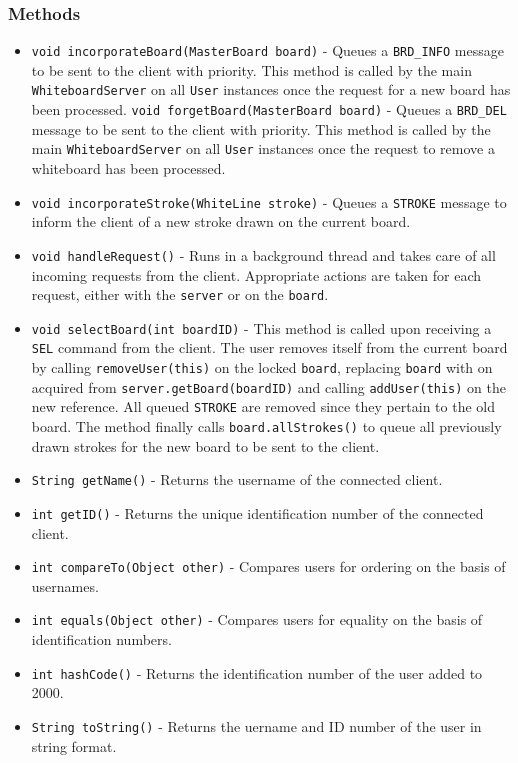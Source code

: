 \subsubsection{Methods}
\begin{itemize}
\item \texttt{void incorporateBoard(MasterBoard board)} - Queues a \texttt{BRD\_INFO} message to be sent to the client with priority. This method is called by the main \texttt{WhiteboardServer} on all \texttt{User} instances once the request for a new board has been processed.
\texttt{void forgetBoard(MasterBoard board)} - Queues a \texttt{BRD\_DEL} message to be sent to the client with priority. This method is called by the main \texttt{WhiteboardServer} on all \texttt{User} instances once the request to remove a whiteboard has been processed.
\item \texttt{void incorporateStroke(WhiteLine stroke)} - Queues a \texttt{STROKE} message to inform the client of a new stroke drawn on the current board.
\item \texttt{void handleRequest()} - Runs in a background thread and takes care of all incoming requests from the client. Appropriate actions are taken for each request, either with the \texttt{server} or on the \texttt{board}.
\item \texttt{void selectBoard(int boardID)} - This method is called upon receiving a \texttt{SEL} command from the client. The user removes itself from the current board by calling \texttt{removeUser(this)} on the locked \texttt{board}, replacing \texttt{board} with on acquired from \texttt{server.getBoard(boardID)} and calling \texttt{addUser(this)} on the new reference. All queued \texttt{STROKE} are removed since they pertain to the old board. The method finally calls \texttt{board.allStrokes()} to queue all previously drawn strokes for the new board to be sent to the client.
\item \texttt{String getName()} - Returns the username of the connected client.
\item \texttt{int getID()} - Returns the unique identification number of the connected client.
\item \texttt{int compareTo(Object other)} - Compares users for ordering on the basis of usernames.
\item \texttt{int equals(Object other)} - Compares users for equality on the basis of identification numbers.
\item \texttt{int hashCode()} - Returns the identification number of the user added to 2000.
\item \texttt{String toString()} - Returns the uername and ID number of the user in string format.
\end{itemize}



